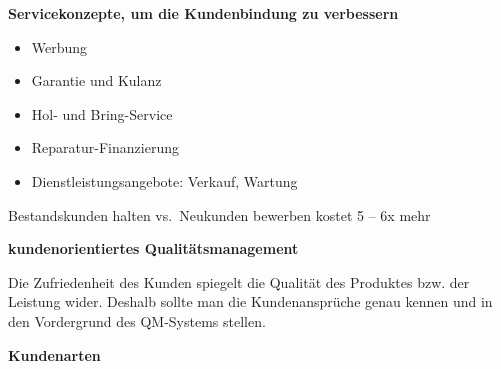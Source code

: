 \textbf{Servicekonzepte, um die Kundenbindung zu verbessern}

\begin{itemize}
\item
  Werbung
\item
  Garantie und Kulanz
\item
  Hol- und Bring-Service
\item
  Reparatur-Finanzierung
\item
  Dienstleistungsangebote: Verkauf, Wartung
\end{itemize}

Bestandskunden halten vs.~Neukunden bewerben kostet 5 -- 6x mehr

\textbf{kundenorientiertes Qualitätsmanagement}

Die Zufriedenheit des Kunden spiegelt die Qualität des Produktes bzw.
der Leistung wider. Deshalb sollte man die Kundenansprüche genau kennen
und in den Vordergrund des QM-Systems stellen.

\newpage

\textbf{Kundenarten}

